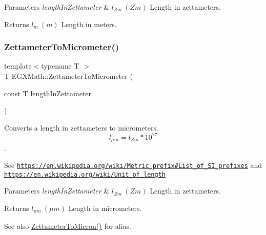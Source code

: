 \begin{DoxyParams}{Parameters}
{\em length\+In\+Zettameter} & $ l_{Zm}\ (Zm)$ Length in zettameters. \\
\hline
\end{DoxyParams}
\begin{DoxyReturn}{Returns}
$ l_{m}\ (m)$ Length in meters. 
\end{DoxyReturn}
\mbox{\label{group___e_g_x_math-_conversions-_length_conversions-_s_i-_zettameter-_s_i_ga495f68a50945d994b3f2d455b3348595}} 
\subsubsection{\texorpdfstring{Zettameter\+To\+Micrometer()}{ZettameterToMicrometer()}}
{\footnotesize\ttfamily template$<$typename T $>$ \\
T E\+G\+X\+Math\+::\+Zettameter\+To\+Micrometer (\begin{DoxyParamCaption}\item[{const T}]{length\+In\+Zettameter }\end{DoxyParamCaption})}



Converts a length in zettameters to micrometers. \[ l_{\mu m}=l_{Zm} * 10^{27} \]. 

See \href{https://en.wikipedia.org/wiki/Metric_prefix#List_of_SI_prefixes}{\tt https\+://en.\+wikipedia.\+org/wiki/\+Metric\+\_\+prefix\#\+List\+\_\+of\+\_\+\+S\+I\+\_\+prefixes} and \href{https://en.wikipedia.org/wiki/Unit_of_length}{\tt https\+://en.\+wikipedia.\+org/wiki/\+Unit\+\_\+of\+\_\+length} 
\begin{DoxyParams}{Parameters}
{\em length\+In\+Zettameter} & $ l_{Zm}\ (Zm)$ Length in zettameters. \\
\hline
\end{DoxyParams}
\begin{DoxyReturn}{Returns}
$ l_{\mu m}\ (\mu m)$ Length in micrometers. 
\end{DoxyReturn}
\begin{DoxySeeAlso}{See also}
\mbox{\hyperlink{group___e_g_x_math-_conversions-_length_conversions-_s_i-_zettameter-_non-_s_i_gafede369c63111d97f92238e626cdfa87}{Zettameter\+To\+Micron()}} for alias. 
\end{DoxySeeAlso}
\mbox{\label{group___e_g_x_math-_conversions-_length_conversions-_s_i-_zettameter-_s_i_ga0a4789d57f14de64a2a3579745c7c5b5}} 
